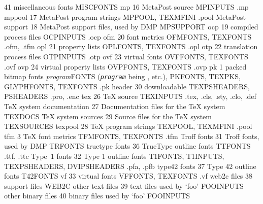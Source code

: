 \documentclass{article}
\begin{document}
\begin{small}
\begin{longtable}
 {41}
 {miscellaneous fonts}
 {MISCFONTS}
 {}
\KpathKey
 {mp}
 {16}
 {MetaPost source}
 {MPINPUTS}
 {.mp}
\KpathKey
 {mppool}
 {17}
 {MetaPost program strings}
 {MPPOOL, TEXMFINI}
 {.pool}
\KpathKey
 {MetaPost support}
 {18}
 {MetaPost support files, used by DMP}
 {MPSUPPORT}
 {}
\KpathKey
 {ocp}
 {19}
 {\OMEGA{} compiled process files}
 {OCPINPUTS}
 {.ocp}
\KpathKey
 {ofm}
 {20}
 {\OMEGA{} font metrics}
 {OFMFONTS, TEXFONTS}
 {.ofm, .tfm}
\KpathKey
 {opl}
 {21}
 {\OMEGA{} property lists}
 {OPLFONTS, TEXFONTS}
 {.opl}
\KpathKey
 {otp}
 {22}
 {\OMEGA{} translation process files}
 {OTPINPUTS}
 {.otp}
\KpathKey
 {ovf}
 {23}
 {\OMEGA{} virtual fonts}
 {OVFFONTS, TEXFONTS}
 {.ovf}
\KpathKey
 {ovp}
 {24}
 {\OMEGA{} virtual property lists}
 {OVPFONTS, TEXFONTS}
 {.ovp}
\KpathKey
 {pk}
 {1}
 {packed bitmap fonts}
 {\emph{program}FONTS \textrm{(\texttt{\emph{program}} being
     ,
     etc.)}, PKFONTS, TEXPKS, GLYPHFONTS, TEXFONTS}
 {.pk}
\KpathKey
 {\PS{} header}
 {30}
 {downloadable \PS{}}
 {TEXPSHEADERS, PSHEADERS}
 {.pro, .enc}
\KpathKey
 {tex}
 {26}
 {\TeX{} source}
 {TEXINPUTS}
 {.tex, .cls, .sty, .clo, .def}
\KpathKey
 {TeX system documentation}
 {27}
 {Documentation files for the \TeX{} system}
 {TEXDOCS}
 {}
\KpathKey
 {TeX system sources}
 {29}
 {Source files for the \TeX{} system}
 {TEXSOURCES}
 {}
\KpathKey
 {texpool}
 {28}
 {\TeX{} program strings}
 {TEXPOOL, TEXMFINI}
 {.pool}
\KpathKey
 {tfm}
 {3}
 {\TeX{} font metrics}
 {TFMFONTS, TEXFONTS}
 {.tfm}
\KpathKey
 {Troff fonts}
 {31}
 {Troff fonts, used by DMP}
 {TRFONTS}
 {}
\KpathKey
 {truetype fonts}
 {36}
 {TrueType outline fonts}
 {TTFONTS}
 {.ttf, .ttc}
\KpathKey
 {Type~1 fonts}
 {32}
 {Type 1 \PS{} outline fonts}
 {T1FONTS, T1INPUTS, TEXPSHEADERS, DVIPSHEADERS}
 {.pfa, .pfb}
\KpathKey
 {type42 fonts}
 {37}
 {Type 42 \PS{} outline fonts}
 {T42FONTS}
 {}
\KpathKey
 {vf}
 {33}
 {virtual fonts}
 {VFFONTS, TEXFONTS}
 {.vf}
\KpathKey
 {web2c files}
 {38}
 {\Webc{} support files}
 {WEB2C}
 {}
\KpathKey
 {other text files}
 {39}
 {text files used by `\textsf{foo}'}
 {FOOINPUTS}
 {}
\KpathKey
 {other binary files}
 {40}
 {binary files used by `\textsf{foo}'}
 {FOOINPUTS}
 {}
\end{longtable}
\end{small}
\end{document}
